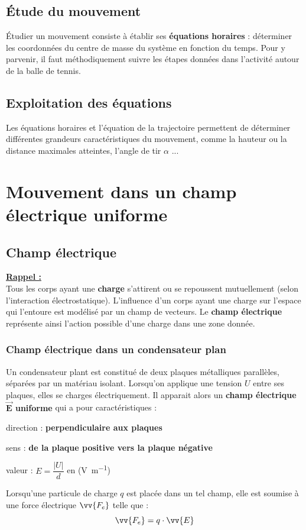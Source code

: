 \documentclass[a4paper,12pt,fleqn]{article}%
\begin{document}
	\subsection{Étude du mouvement}
Étudier un mouvement consiste à établir ses \textbf{équations horaires} : déterminer les coordonnées du centre de masse du système en fonction du temps. Pour y parvenir, il faut méthodiquement suivre les étapes données dans l'activité autour de la balle de tennis.


	\subsection{Exploitation des équations}
Les équations horaires et l'équation de la trajectoire permettent de déterminer différentes grandeurs caractéristiques du mouvement, comme la hauteur ou la distance maximales atteintes, l'angle de tir $\alpha$ ...

\section{Mouvement dans un champ électrique uniforme}
	\subsection{Champ électrique}
\underline{\textbf{Rappel :}}\\
Tous les corps ayant une \textbf{charge} s'attirent ou se repoussent mutuellement (selon l'interaction électrostatique). L'influence d'un corps ayant une charge sur l'espace qui l'entoure est modélisé par un champ de vecteurs. Le \textbf{champ électrique} représente ainsi l'action possible d'une charge dans une zone donnée.
		\subsubsection*{Champ électrique dans un condensateur plan}
Un condensateur plant est constitué de deux plaques métalliques parallèles, séparées par un matériau isolant. Lorsqu'on applique une tension $U$ entre ses plaques, elles se charges électriquement. Il apparait alors un \textbf{champ électrique $\mathbf{\vec{E}}$ uniforme} qui a pour caractéristiques :
\begin{itemize*}
	\item direction : \textbf{perpendiculaire aux plaques}
	\item sens : \textbf{de la plaque positive vers la plaque négative}
	\item valeur : $E = \dfrac{|U|}{d}$ en (\unit{\volt\per\meter})
\end{itemize*}
Lorsqu'une particule de charge $q$ est placée dans un tel champ, elle est soumise à une force électrique $\vv{F_e}$ telle que : 
$$\vv{F_e}=q \cdot \vv{E}$$
\end{document}
